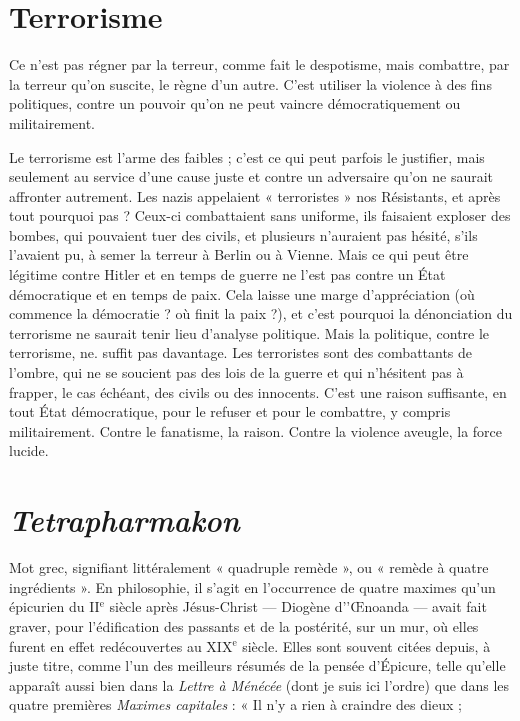 \section{Terrorisme}
Ce n’est pas régner par la terreur, comme fait le despotisme,
mais combattre, par la terreur qu’on suscite, le règne d’un
autre. C’est utiliser la violence à des fins politiques, contre un pouvoir qu’on ne
peut vaincre démocratiquement ou militairement.

Le terrorisme est l’arme des faibles ; c’est ce qui peut parfois le justifier, mais
seulement au service d’une cause juste et contre un adversaire qu'on ne saurait
affronter autrement. Les nazis appelaient « terroristes » nos Résistants, et après
tout pourquoi pas ? Ceux-ci combattaient sans uniforme, ils faisaient exploser des
bombes, qui pouvaient tuer des civils, et plusieurs n'auraient pas hésité, s’ils
l'avaient pu, à semer la terreur à Berlin ou à Vienne. Mais ce qui peut être légitime
contre Hitler et en temps de guerre ne l’est pas contre un État démocratique
et en temps de paix. Cela laisse une marge d’appréciation (où commence la
démocratie ? où finit la paix ?), et c’est pourquoi la dénonciation du terrorisme ne
saurait tenir lieu d’analyse politique. Mais la politique, contre le terrorisme, ne.
suffit pas davantage. Les terroristes sont des combattants de l'ombre, qui ne se
soucient pas des lois de la guerre et qui n’hésitent pas à frapper, le cas échéant, des
civils ou des innocents. C’est une raison suffisante, en tout État démocratique,
pour le refuser et pour le combattre, y compris militairement. Contre le fanatisme,
la raison. Contre la violence aveugle, la force lucide.

\section{{\it Tetrapharmakon}}
Mot grec, signifiant littéralement « quadruple remède »,
ou « remède à quatre ingrédients ». En philosophie,
il s’agit en l'occurrence de quatre maximes qu’un épicurien du {\footnotesize II$^\text{e}$} siècle après
Jésus-Christ — Diogène d’'Œnoanda — avait fait graver, pour l'édification des passants
et de la postérité, sur un mur, où elles furent en effet redécouvertes au {\footnotesize XIX$^\text{e}$}
siècle. Elles sont souvent citées depuis, à juste titre, comme l’un des meilleurs
résumés de la pensée d’Épicure, telle qu’elle apparaît aussi bien dans la {\it Lettre à
Ménécée} (dont je suis ici l’ordre) que dans les quatre premières {\it Maximes capitales} :
« Il n’y a rien à craindre des dieux ;

